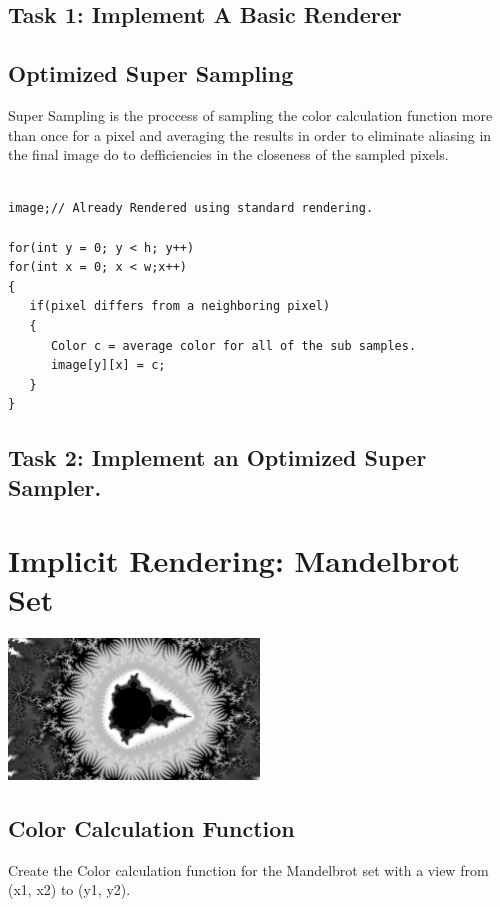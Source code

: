 \documentclass[12pt, letterpaper]{article}
\begin{document}
\subsection{Task 1: Implement A Basic Renderer}

\subsection{Optimized Super Sampling}

Super Sampling is the proccess of sampling the color calculation function more than once for a pixel and averaging the results in order to eliminate aliasing in the final image do to defficiencies in the closeness of the sampled pixels.

\begin{verbatim}

image;// Already Rendered using standard rendering.

for(int y = 0; y < h; y++)
for(int x = 0; x < w;x++)
{
   if(pixel differs from a neighboring pixel)
   {
      Color c = average color for all of the sub samples.
      image[y][x] = c;	
   }
}
\end{verbatim}

\subsection{Task 2: Implement an Optimized Super Sampler.}

\newpage
\section{Implicit Rendering: Mandelbrot Set}

\begin{center}
\includegraphics[width=0.5\textwidth]{Mandelbrot.png}
\end{center}

\subsection{Color Calculation Function}
Create the Color calculation function for the Mandelbrot set with a view from (x1, x2) to (y1, y2).
\end{document}
